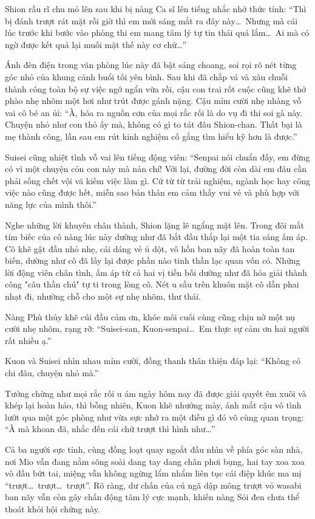 \documentclass[../main.tex]{subfiles}
\begin{document}
Shion rầu rĩ chu mỏ lên sau khi bị nàng Ca sĩ lên tiếng nhắc nhở thức tỉnh: ``Thì bị đánh trượt rát mặt rồi giờ thì em mới sáng mắt ra đây này\dots\ Nhưng mà cái lúc trước khi bước vào phòng thi em mang tâm lý tự tin thái quá lắm\dots\ Ai mà có ngờ được kết quả lại muối mặt thế này cơ chứ\dots''

Ánh đèn điện trong văn phòng lúc này đã bật sáng choang, soi rọi rõ nét từng góc nhỏ của khung cảnh buổi tối yên bình. Sau khi đã chắp vá và xâu chuỗi thành công toàn bộ sự việc ngớ ngẩn vừa rồi, cậu con trai rốt cuộc cũng khẽ thở phào nhẹ nhõm một hơi như trút được gánh nặng. Cậu mỉm cười nhẹ nhàng vỗ vai cô bé an ủi: ``À, hóa ra nguồn cơn của mọi rắc rối là do vụ đi thi soi gà này. Chuyện nhỏ như con thỏ ấy mà, không có gì to tát đâu Shion-chan. Thất bại là mẹ thành công, lần sau em rút kinh nghiệm cố gắng tìm hiểu kỹ hơn là được.''

Suisei cũng nhiệt tình vỗ vai lên tiếng động viên: ``Senpai nói chuẩn đấy, em đừng có vì một chuyện cỏn con này mà nản chí! Với lại, đường đời còn dài em đâu cần phải sống chết vội vã kiếm việc làm gì. Cứ từ từ trải nghiệm, ngành học hay công việc nào cũng được hết, miễn sao bản thân em cảm thấy vui vẻ và phù hợp với năng lực của mình thôi.''

Nghe những lời khuyên chân thành, Shion lặng lẽ ngẩng mặt lên. Trong đôi mắt tím biếc của cô nàng lúc này dường như đã bắt đầu thắp lại một tia sáng ấm áp. Cô khẽ gật đầu nhỏ nhẹ, cái dáng vẻ ủ dột, vô hồn ban nãy đã hoàn toàn tan biến, dường như cô đã lấy lại được phần nào tinh thần lạc quan vốn có. Những lời động viên chân tình, ấm áp từ cả hai vị tiền bối dường như đã hóa giải thành công "câu thần chú" tự ti trong lòng cô. Nét u sầu trên khuôn mặt cô dần phai nhạt đi, nhường chỗ cho một sự nhẹ nhõm, thư thái.

Nàng Phù thủy khẽ cúi đầu cảm ơn, khóe môi cuối cùng cũng chịu nở một nụ cười nhẹ nhõm, rạng rỡ: ``Suisei-san, Kuon-senpai\dots\ Em thực sự cảm ơn hai người rất nhiều ạ.''

Kuon và Suisei nhìn nhau mỉm cười, đồng thanh thân thiện đáp lại: ``Không có chi đâu, chuyện nhỏ mà.''

Tưởng chừng như mọi rắc rối u ám ngày hôm nay đã được giải quyết êm xuôi và khép lại hoàn hảo, thì bỗng nhiên, Kuon khẽ nhướng mày, ánh mắt cậu vô tình lướt qua một góc phòng như vừa sực nhớ ra một điều gì đó vô cùng quan trọng: ``À mà khoan đã, nhắc đến cái chữ trượt thì hình như\dots''

Cả ba người sực tỉnh, cùng đồng loạt quay ngoắt đầu nhìn về phía góc sàn nhà, nơi Mio vẫn đang nằm sõng soài dang tay dang chân phơi bụng, hai tay xoa xoa vò đầu bứt tai, miệng vẫn không ngừng lẩm nhẩm liên tục cái điệp khúc ma mị ``trượt\dots\ trượt\dots\ trượt''. Rõ ràng, dư chấn của cú ngã dập mông trượt vỏ wasabi ban nãy vẫn còn gây chấn động tâm lý cực mạnh, khiến nàng Sói đen chưa thể thoát khỏi hội chứng này.
\end{document}
